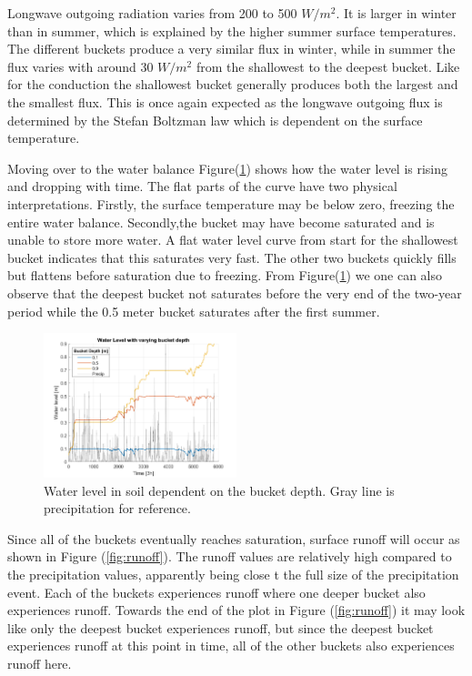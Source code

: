 \documentclass[a4paper,11pt,twocolumn]{article}
\begin{document}
Longwave outgoing radiation varies from 200 to 500 $W/m^2$. It is larger in winter than in summer, which is explained by the higher summer surface temperatures. The different buckets produce a very similar flux in winter, while in summer the flux varies with around 30 $W/m^2$ from the shallowest to the deepest bucket. Like for the conduction the shallowest bucket generally produces both the largest and the smallest flux. This is once again expected as the longwave outgoing flux is determined by the Stefan Boltzman law which is dependent on the surface temperature. 

Moving over to the water balance Figure(\ref{fig:bucket_fixed}) shows how the water level is rising and dropping with time. The flat parts of the curve have two physical interpretations. Firstly, the surface temperature may be below zero, freezing the entire water balance. Secondly,the bucket may have become saturated and is unable to store more water. A flat water level curve from start for the shallowest bucket indicates that this saturates very fast. The other two buckets quickly fills but flattens before saturation due to freezing. From Figure(\ref{fig:bucket_fixed}) we one can also observe that the deepest bucket not saturates before the very end of the two-year period while the 0.5 meter bucket saturates after the first summer. 

\begin{figure}[h]
	\centering 
	\includegraphics[width=0.5\textwidth]{figures/bucket_depth_fixed}
	\caption{Water level in soil dependent on the bucket depth.   Gray line is precipitation for reference.}
	\label{fig:bucket_fixed}
\end{figure}

Since all of the buckets eventually reaches saturation, surface runoff will occur as shown in Figure (\ref{fig:runoff}). The runoff values are relatively high compared to the precipitation values, apparently being close t the full size of the precipitation event. Each of the buckets experiences runoff where one deeper bucket also experiences runoff. Towards the end of the plot in Figure (\ref{fig:runoff}) it may look like only the deepest bucket experiences runoff, but since the deepest bucket experiences runoff at this point in time, all of the other buckets also experiences runoff here.  
\end{document}
